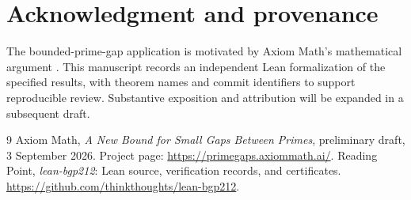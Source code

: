 \documentclass[11pt]{article}
\begin{document}
\section*{Acknowledgment and provenance}
The bounded-prime-gap application is motivated by Axiom Math's mathematical argument
\cite{axiom}. This manuscript records an independent Lean formalization of the
specified results, with theorem names and commit identifiers to support reproducible
review. Substantive exposition and attribution will be expanded in a subsequent draft.

\begin{thebibliography}{9}
Axiom Math, \emph{A New Bound for Small Gaps Between Primes}, preliminary draft,
3 September 2026. Project page:
\url{https://primegaps.axiommath.ai/}.
Reading Point, \emph{lean-bgp212}: Lean source, verification records, and certificates.
\url{https://github.com/thinkthoughts/lean-bgp212}.
\end{thebibliography}
\end{document}
